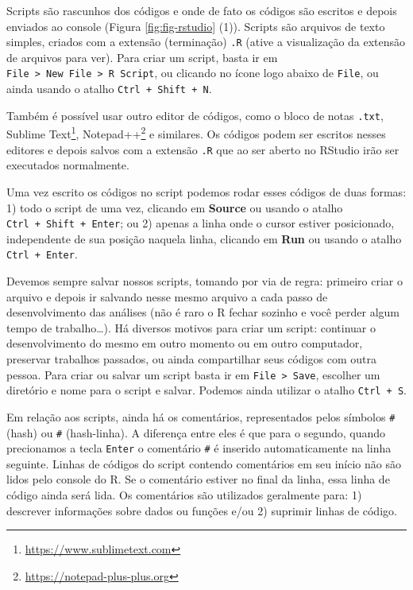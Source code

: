 \documentclass[
]{book}
\renewcommand{\href}[2]{#2\footnote{\url{#1}}}
\begin{document}
Scripts são rascunhos dos códigos e onde de fato os códigos são escritos e depois enviados ao console (Figura \ref{fig:fig-rstudio} (1)). Scripts são arquivos de texto simples, criados com a extensão (terminação) \texttt{.R} (ative a visualização da extensão de arquivos para ver). Para criar um script, basta ir em \texttt{File\ \textgreater{}\ New\ File\ \textgreater{}\ R\ Script}, ou clicando no ícone logo abaixo de \texttt{File}, ou ainda usando o atalho \texttt{Ctrl\ +\ Shift\ +\ N}.

Também é possível usar outro editor de códigos, como o bloco de notas \texttt{.txt}, \href{https://www.sublimetext.com}{Sublime Text}, \href{https://notepad-plus-plus.org}{Notepad++} e similares. Os códigos podem ser escritos nesses editores e depois salvos com a extensão \texttt{.R} que ao ser aberto no RStudio irão ser executados normalmente.

Uma vez escrito os códigos no script podemos rodar esses códigos de duas formas: 1) todo o script de uma vez, clicando em \textbf{Source} ou usando o atalho \texttt{Ctrl\ +\ Shift\ +\ Enter}; ou 2) apenas a linha onde o cursor estiver posicionado, independente de sua posição naquela linha, clicando em \textbf{Run} ou usando o atalho \texttt{Ctrl\ +\ Enter}.

Devemos sempre salvar nossos scripts, tomando por via de regra: primeiro criar o arquivo e depois ir salvando nesse mesmo arquivo a cada passo de desenvolvimento das análises (não é raro o R fechar sozinho e você perder algum tempo de trabalho\ldots). Há diversos motivos para criar um script: continuar o desenvolvimento do mesmo em outro momento ou em outro computador, preservar trabalhos passados, ou ainda compartilhar seus códigos com outra pessoa. Para criar ou salvar um script basta ir em \texttt{File\ \textgreater{}\ Save}, escolher um diretório e nome para o script e salvar. Podemos ainda utilizar o atalho \texttt{Ctrl\ +\ S}.

Em relação aos scripts, ainda há os comentários, representados pelos símbolos \texttt{\#} (hash) ou \texttt{\#\textquotesingle{}} (hash-linha). A diferença entre eles é que para o segundo, quando precionamos a tecla \texttt{Enter} o comentário \texttt{\#\textquotesingle{}} é inserido automaticamente na linha seguinte. Linhas de códigos do script contendo comentários em seu início não são lidos pelo console do R. Se o comentário estiver no final da linha, essa linha de código ainda será lida. Os comentários são utilizados geralmente para: 1) descrever informações sobre dados ou funções e/ou 2) suprimir linhas de código.
\end{document}
